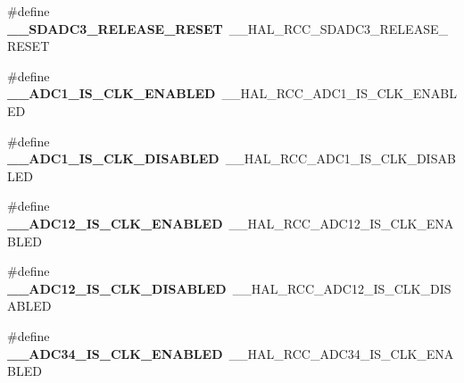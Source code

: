 \begin{DoxyCompactItemize}
\item 
\hypertarget{group___h_a_l___r_c_c___aliased_gaeea6e6ea584aed7317914020ccd3e071}{\#define {\bfseries \-\_\-\-\_\-\-S\-D\-A\-D\-C3\-\_\-\-R\-E\-L\-E\-A\-S\-E\-\_\-\-R\-E\-S\-E\-T}~\-\_\-\-\_\-\-H\-A\-L\-\_\-\-R\-C\-C\-\_\-\-S\-D\-A\-D\-C3\-\_\-\-R\-E\-L\-E\-A\-S\-E\-\_\-\-R\-E\-S\-E\-T}\label{group___h_a_l___r_c_c___aliased_gaeea6e6ea584aed7317914020ccd3e071}

\item 
\hypertarget{group___h_a_l___r_c_c___aliased_ga9c6a5800240c7a38160f7b55d993d014}{\#define {\bfseries \-\_\-\-\_\-\-A\-D\-C1\-\_\-\-I\-S\-\_\-\-C\-L\-K\-\_\-\-E\-N\-A\-B\-L\-E\-D}~\-\_\-\-\_\-\-H\-A\-L\-\_\-\-R\-C\-C\-\_\-\-A\-D\-C1\-\_\-\-I\-S\-\_\-\-C\-L\-K\-\_\-\-E\-N\-A\-B\-L\-E\-D}\label{group___h_a_l___r_c_c___aliased_ga9c6a5800240c7a38160f7b55d993d014}

\item 
\hypertarget{group___h_a_l___r_c_c___aliased_ga72176a626f4a7bafd415028cc446093e}{\#define {\bfseries \-\_\-\-\_\-\-A\-D\-C1\-\_\-\-I\-S\-\_\-\-C\-L\-K\-\_\-\-D\-I\-S\-A\-B\-L\-E\-D}~\-\_\-\-\_\-\-H\-A\-L\-\_\-\-R\-C\-C\-\_\-\-A\-D\-C1\-\_\-\-I\-S\-\_\-\-C\-L\-K\-\_\-\-D\-I\-S\-A\-B\-L\-E\-D}\label{group___h_a_l___r_c_c___aliased_ga72176a626f4a7bafd415028cc446093e}

\item 
\hypertarget{group___h_a_l___r_c_c___aliased_ga4ba622ec6ed0408b17c9c68523fa6629}{\#define {\bfseries \-\_\-\-\_\-\-A\-D\-C12\-\_\-\-I\-S\-\_\-\-C\-L\-K\-\_\-\-E\-N\-A\-B\-L\-E\-D}~\-\_\-\-\_\-\-H\-A\-L\-\_\-\-R\-C\-C\-\_\-\-A\-D\-C12\-\_\-\-I\-S\-\_\-\-C\-L\-K\-\_\-\-E\-N\-A\-B\-L\-E\-D}\label{group___h_a_l___r_c_c___aliased_ga4ba622ec6ed0408b17c9c68523fa6629}

\item 
\hypertarget{group___h_a_l___r_c_c___aliased_ga9464b6c06f15be9e00a1c1ed79dbe8d6}{\#define {\bfseries \-\_\-\-\_\-\-A\-D\-C12\-\_\-\-I\-S\-\_\-\-C\-L\-K\-\_\-\-D\-I\-S\-A\-B\-L\-E\-D}~\-\_\-\-\_\-\-H\-A\-L\-\_\-\-R\-C\-C\-\_\-\-A\-D\-C12\-\_\-\-I\-S\-\_\-\-C\-L\-K\-\_\-\-D\-I\-S\-A\-B\-L\-E\-D}\label{group___h_a_l___r_c_c___aliased_ga9464b6c06f15be9e00a1c1ed79dbe8d6}

\item 
\hypertarget{group___h_a_l___r_c_c___aliased_ga5f63de772d3934e3fd5e31cfd91ec6de}{\#define {\bfseries \-\_\-\-\_\-\-A\-D\-C34\-\_\-\-I\-S\-\_\-\-C\-L\-K\-\_\-\-E\-N\-A\-B\-L\-E\-D}~\-\_\-\-\_\-\-H\-A\-L\-\_\-\-R\-C\-C\-\_\-\-A\-D\-C34\-\_\-\-I\-S\-\_\-\-C\-L\-K\-\_\-\-E\-N\-A\-B\-L\-E\-D}\label{group___h_a_l___r_c_c___aliased_ga5f63de772d3934e3fd5e31cfd91ec6de}


\end{DoxyCompactItemize}
